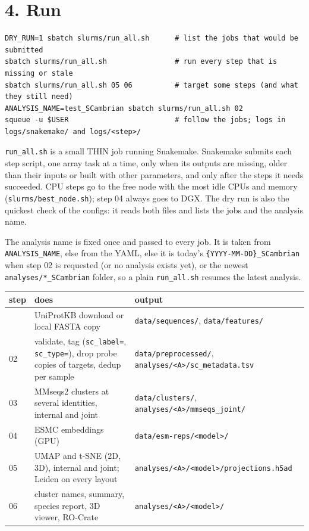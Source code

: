 \documentclass[
  10pt,
]{article}
\begin{document}
\section{4. Run}

\begin{verbatim}
DRY_RUN=1 sbatch slurms/run_all.sh      # list the jobs that would be submitted
sbatch slurms/run_all.sh                # run every step that is missing or stale
sbatch slurms/run_all.sh 05 06          # target some steps (and what they still need)
ANALYSIS_NAME=test_SCambrian sbatch slurms/run_all.sh 02
squeue -u $USER                         # follow the jobs; logs in logs/snakemake/ and logs/<step>/
\end{verbatim}

\texttt{run\_all.sh} is a small THIN job running Snakemake. Snakemake submits each step script, one array task at a time, only when its outputs are missing, older than their inputs or built with other parameters, and only after the steps it needs succeeded. CPU steps go to the free node with the most idle CPUs and memory (\texttt{slurms/best\_node.sh}); step 04 always goes to DGX. The dry run is also the quickest check of the configs: it reads both files and lists the jobs and the analysis name.

The analysis name is fixed once and passed to every job. It is taken from \texttt{ANALYSIS\_NAME}, else from the YAML, else it is today's \texttt{\{YYYY-MM-DD\}\_SCambrian} when step 02 is requested (or no analysis exists yet), or the newest \texttt{analyses/*\_SCambrian} folder, so a plain \texttt{run\_all.sh} resumes the latest analysis.

\begin{longtable}[]{@{}p{}p{}p{}@{}}
\toprule\noalign{}
step & does & output \\
\midrule\noalign{}
\endhead
\bottomrule\noalign{}
\endlastfoot
01 & UniProtKB download or local FASTA copy & \texttt{data/sequences/}, \texttt{data/features/} \\
02 & validate, tag (\texttt{sc\_label=}, \texttt{sc\_type=}), drop probe copies of targets, dedup per sample & \texttt{data/preprocessed/}, \texttt{analyses/<A>/sc\_metadata.tsv} \\
03 & MMseqs2 clusters at several identities, internal and joint & \texttt{data/clusters/}, \texttt{analyses/<A>/mmseqs\_joint/} \\
04 & ESMC embeddings (GPU) & \texttt{data/esm-reps/<model>/} \\
05 & UMAP and t-SNE (2D, 3D), internal and joint; Leiden on every layout & \texttt{analyses/<A>/<model>/projections.h5ad} \\
06 & cluster names, summary, species report, 3D viewer, RO-Crate & \texttt{analyses/<A>/<model>/} \\
\end{longtable}
\end{document}
